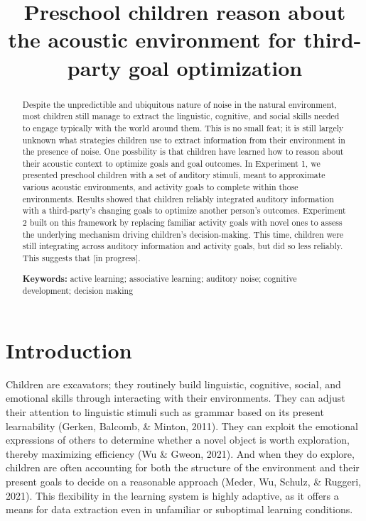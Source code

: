\documentclass[10pt, letterpaper]{article}
\title{Preschool children reason about the acoustic environment for
third-party goal optimization}
\begin{document}
\maketitle

\begin{abstract}
Despite the unpredictible and ubiquitous nature of noise in the natural
environment, most children still manage to extract the linguistic,
cognitive, and social skills needed to engage typically with the world
around them. This is no small feat; it is still largely unknown what
strategies children use to extract information from their environment in
the presence of noise. One possbility is that children have learned how
to reason about their acoustic context to optimize goals and goal
outcomes. In Experiment 1, we presented preschool children with a set of
auditory stimuli, meant to approximate various acoustic environments,
and activity goals to complete within those environments. Results showed
that children reliably integrated auditory information with a
third-party's changing goals to optimize another person's outcomes.
Experiment 2 built on this framework by replacing familiar activity
goals with novel ones to assess the underlying mechanism driving
children's decision-making. This time, children were still integrating
across auditory information and activity goals, but did so less
reliably. This suggests that {[}in progress{]}.

\textbf{Keywords:}
active learning; associative learning; auditory noise; cognitive
development; decision making
\end{abstract}

\hypertarget{introduction}{%
\section{Introduction}\label{introduction}}

Children are excavators; they routinely build linguistic, cognitive,
social, and emotional skills through interacting with their
environments. They can adjust their attention to linguistic stimuli such
as grammar based on its present learnability (Gerken, Balcomb, \&
Minton, 2011). They can exploit the emotional expressions of others to
determine whether a novel object is worth exploration, thereby
maximizing efficiency (Wu \& Gweon, 2021). And when they do explore,
children are often accounting for both the structure of the environment
and their present goals to decide on a reasonable approach (Meder, Wu,
Schulz, \& Ruggeri, 2021). This flexibility in the learning system is
highly adaptive, as it offers a means for data extraction even in
unfamiliar or suboptimal learning conditions.
\end{document}
